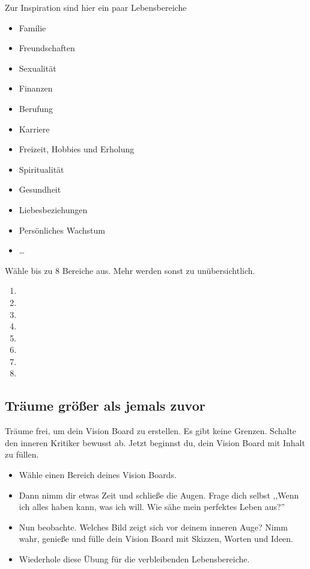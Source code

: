 \documentclass[../Lebensziel.tex]{subfiles}
\begin{document}
Zur Inspiration sind hier ein paar Lebensbereiche
\begin{multicols}{2}
    \begin{itemize}
        \item Familie
        \item Freundschaften
        \item Sexualität
        \item Finanzen
        \item Berufung
        \item Karriere
        \item Freizeit, Hobbies und Erholung
        \item Spiritualität
        \item Gesundheit
        \item Liebesbeziehungen
        \item Persönliches Wachstum
        \item \dots
    \end{itemize}
\end{multicols}

Wähle bis zu 8 Bereiche aus. Mehr werden sonst zu unübersichtlich.

\begin{Form}
    \begin{enumerate}
        \item \TextField[width=12cm]{}
        \item \TextField[width=12cm]{}
        \item \TextField[width=12cm]{}
        \item \TextField[width=12cm]{}
        \item \TextField[width=12cm]{}
        \item \TextField[width=12cm]{}
        \item \TextField[width=12cm]{}
        \item \TextField[width=12cm]{}
    \end{enumerate}
\end{Form}

\subsection{Träume größer als jemals zuvor}
Träume frei, um dein Vision Board zu erstellen. Es gibt keine Grenzen. Schalte den inneren Kritiker bewusst ab.
Jetzt beginnst du, dein Vision Board mit Inhalt zu füllen.

\begin{itemize}
    \item Wähle einen Bereich deines Vision Boards.
    \item Dann nimm dir etwas Zeit und schließe die Augen. Frage dich selbst ,,Wenn ich alles haben kann, was ich will. Wie sähe mein perfektes Leben aus?''
    \item Nun beobachte. Welches Bild zeigt sich vor deinem inneren Auge? Nimm wahr, genieße und fülle dein Vision Board mit Skizzen, Worten und Ideen.
    \item Wiederhole diese Übung für die verbleibenden Lebensbereiche.
\end{itemize}
\end{document}
